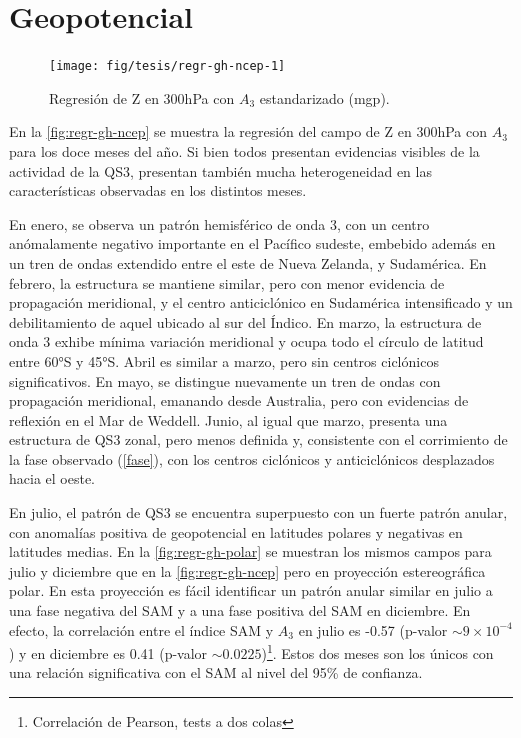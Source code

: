 \documentclass[spanish,a4paper,12pt,oneside]{book}
\let\rmarkdownfootnote\footnote%
\def\footnote{\protect\rmarkdownfootnote}
\begin{document}
\section*{Geopotencial}

\begin{landscape}\begin{figure}

{\centering \texttt{[image: fig/tesis/regr-gh-ncep-1]} 

}

\caption{Regresión de Z en 300hPa con $A_3$ estandarizado (mgp).}\label{fig:regr-gh-ncep}
\end{figure}
\end{landscape}

En la \autoref{fig:regr-gh-ncep} se muestra la regresión del campo de Z
en 300hPa con \(A_3\) para los doce meses del año. Si bien todos
presentan evidencias visibles de la actividad de la QS3, presentan
también mucha heterogeneidad en las características observadas en los
distintos meses.

En enero, se observa un patrón hemisférico de onda 3, con un centro
anómalamente negativo importante en el Pacífico sudeste, embebido además
en un tren de ondas extendido entre el este de Nueva Zelanda, y
Sudamérica. En febrero, la estructura se mantiene similar, pero con
menor evidencia de propagación meridional, y el centro anticiclónico en
Sudamérica intensificado y un debilitamiento de aquel ubicado al sur del
Índico. En marzo, la estructura de onda 3 exhibe mínima variación
meridional y ocupa todo el círculo de latitud entre 60°S y 45°S. Abril
es similar a marzo, pero sin centros ciclónicos significativos. En mayo,
se distingue nuevamente un tren de ondas con propagación meridional,
emanando desde Australia, pero con evidencias de reflexión en el Mar de
Weddell. Junio, al igual que marzo, presenta una estructura de QS3
zonal, pero menos definida y, consistente con el corrimiento de la fase
observado (\autoref{fase}), con los centros ciclónicos y anticiclónicos
desplazados hacia el oeste.

En julio, el patrón de QS3 se encuentra superpuesto con un fuerte patrón
anular, con anomalías positiva de geopotencial en latitudes polares y
negativas en latitudes medias. En la \autoref{fig:regr-gh-polar} se
muestran los mismos campos para julio y diciembre que en la
\autoref{fig:regr-gh-ncep} pero en proyección estereográfica polar. En
esta proyección es fácil identificar un patrón anular similar en julio a
una fase negativa del SAM y a una fase positiva del SAM en diciembre. En
efecto, la correlación entre el índice SAM y \(A_3\) en julio es -0.57
(p-valor \(\sim 9\times 10^{-4}\)) y en diciembre es 0.41 (p-valor
\(\sim 0.0225\))\footnote{Correlación de Pearson, tests a dos colas}.
Estos dos meses son los únicos con una relación significativa con el SAM
al nivel del 95\% de confianza.
\end{document}
